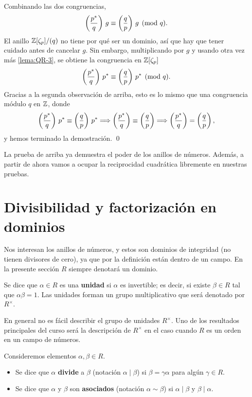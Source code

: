 Combinando las dos congruencias,
$$\left(\frac{p^*}{q}\right)\,g \equiv \left(\frac{q}{p}\right)\,g \pmod{q}.$$
El anillo $\mathbb{Z} [\zeta_p]/(q)$ no tiene por qué ser un dominio, así que hay que
tener cuidado antes de cancelar $g$. Sin embargo, multiplicando por $g$ y usando
otra vez más \ref{lema:QR-3}, se obtiene la congruencia en $\mathbb{Z} [\zeta_p]$
$$\left(\frac{p^*}{q}\right)\,p^* \equiv \left(\frac{q}{p}\right)\,p^* \pmod{q}.$$
Gracias a la segunda observación de arriba, esto es lo mismo que una congruencia
módulo $q$ en $\mathbb{Z}$, donde
\[ \left(\frac{p^*}{q}\right)\,p^* \equiv \left(\frac{q}{p}\right)\,p^* \Longrightarrow
   \left(\frac{p^*}{q}\right) \equiv \left(\frac{q}{p}\right) \Longrightarrow
   \left(\frac{p^*}{q}\right) = \left(\frac{q}{p}\right), \]
y hemos terminado la demostración. \qed

\vspace{1em}

La prueba de arriba ya demuestra el poder de los anillos de números.
Además, a partir de ahora vamos a ocupar la reciprocidad cuadrática libremente
en nuestras pruebas.


\section{Divisibilidad y factorización en dominios}

Nos interesan los anillos de números, y estos son dominios de integridad
(no tienen divisores de cero), ya que por la definición están dentro de
un campo. En la presente sección $R$ siempre denotará un dominio.

\begin{definicion}
  Se dice que $\alpha \in R$ es una \textbf{unidad} si $\alpha$ es invertible;
  es decir, si existe $\beta \in R$ tal que $\alpha\beta = 1$. Las unidades
  forman un grupo multiplicativo que será denotado por $R^\times$.
\end{definicion}

En general no es fácil describir el grupo de unidades $R^\times$.
Uno de los resultados principales del curso será la descripción de $R^\times$
en el caso cuando $R$ es un orden en un campo de números.

\begin{definicion}
  Consideremos elementos $\alpha,\beta\in R$.

  \begin{itemize}
  \item Se dice que $\alpha$ \textbf{divide} a $\beta$ (notación
    $\alpha\mid\beta$) si $\beta = \gamma\alpha$ para algún $\gamma\in R$.

  \item Se dice que $\alpha$ y $\beta$ son \textbf{asociados}
    (notación $\alpha \sim \beta$) si $\alpha\mid\beta$ y $\beta\mid\alpha$.
  \end{itemize}
\end{definicion}

